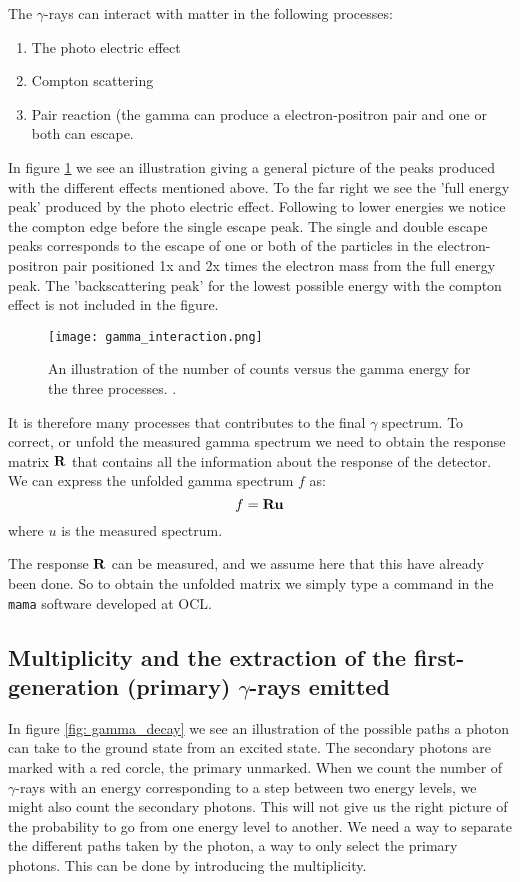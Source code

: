 \documentclass[11pt,a4wide]{article}
\begin{document}
The $\gamma$-rays can interact with matter in the following processes:
\begin{enumerate}
\item The photo electric effect
\item Compton scattering
\item Pair reaction (the gamma can produce a electron-positron pair and one or both can escape. 
\end{enumerate}

In figure \ref{fig: gamma_interaction} we see an illustration giving a general picture of the peaks produced with the different effects mentioned above. To the far right we see the 'full energy peak' produced by the photo electric effect. Following to lower energies we notice the compton edge before the single escape peak. The single and double escape peaks corresponds to the escape of one or both of the particles in the electron-positron pair positioned 1x and 2x times the electron mass from the full energy peak. The 'backscattering peak' for the lowest possible energy with the compton effect is not included in the figure.

\begin{figure}[htp]
\centering
\texttt{[image: gamma\_interaction.png]}
\caption{An illustration of the number of counts versus the gamma energy for the three processes. .}
\label{fig: gamma_interaction}
\end{figure}

It is therefore many processes that contributes to the final $\gamma$ spectrum. To correct, or unfold the measured gamma spectrum we need to obtain the response matrix $\bf R$ that contains all the information about the response of the detector. We can express the unfolded gamma spectrum $f$ as:
\[
f = \bf{R} u
\]
where $u$ is the measured spectrum. 

The response $\bf R$ can be measured, and we assume here that this have already been done. So to obtain the unfolded matrix we simply type a command in the \texttt{mama} software developed at OCL. 


\subsection{Multiplicity and the extraction of the first-generation (primary) $\gamma$-rays emitted}
In figure \ref{fig: gamma_decay} we see an illustration of the possible paths a photon can take to the ground state from an excited state. The secondary photons are marked with a red corcle, the primary unmarked. When we count the number of $\gamma$-rays with an energy corresponding to a step between two energy levels, we might also count the secondary photons. This will not give us the right picture of the probability to go from one energy level to another. We need a way to separate the different paths taken by the photon, a way to only select the primary photons. This can be done by introducing the multiplicity. 
\end{document}
